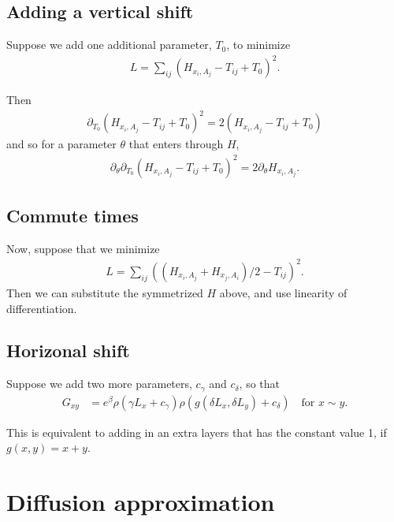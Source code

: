 \documentclass{article}
\begin{document}
\subsection{Adding a vertical shift}

Suppose we add one additional parameter, $T_0$, to minimize
\begin{align}
  L = \sum_{ij} \left( H_{x_i,A_j} - T_{ij} + T_0 \right)^2 .
\end{align}

Then
\begin{align}
    \partial_{T_0} \left(H_{x_i,A_j} - T_{ij} + T_0 \right)^2 = 2 \left(H_{x_i,A_j} - T_{ij} + T_0 \right)
\end{align}
and so for a parameter $\theta$ that enters through $H$,
\begin{align}
    \partial_\theta \partial_{T_0} \left(H_{x_i,A_j} - T_{ij} + T_0 \right)^2 = 2 \partial_\theta H_{x_i,A_j}  .
\end{align}

\subsection{Commute times}

Now, suppose that we minimize
\begin{align}
    L = \sum_{ij} \left( (H_{x_i,A_j}+H_{x_j,A_i})/2 - T_{ij} \right)^2 .
\end{align}
Then we can substitute the symmetrized $H$ above, and use linearity of differentiation.

\subsection{Horizonal shift}

Suppose we add two more parameters, $c_\gamma$ and $c_\delta$, so that
\begin{align}
    G_{xy} &= e^\beta \rho( \gamma L_x + c_\gamma ) \rho( g( \delta L_x, \delta L_y ) + c_\delta ) \quad \text{for $x \sim y$}  .
\end{align}

This is equivalent to adding in an extra layers that has the constant value 1,
if $g(x,y) = x+y$.



\section{Diffusion approximation}
\end{document}
